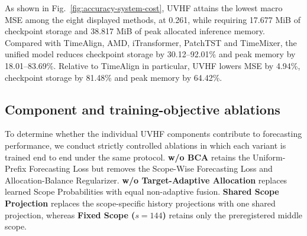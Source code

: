 \documentclass[final,3p,times]{elsarticle}
\begin{document}
As shown in Fig.~\ref{fig:accuracy-system-cost}, UVHF attains the lowest macro MSE among the eight displayed methods, at 0.261, while requiring 17.677 MiB of checkpoint storage and 38.817 MiB of peak allocated inference memory. Compared with TimeAlign, AMD, iTransformer, PatchTST and TimeMixer, the unified model reduces checkpoint storage by 30.12--92.01\% and peak memory by 18.01--83.69\%. Relative to TimeAlign in particular, UVHF lowers MSE by 4.94\%, checkpoint storage by 81.48\% and peak memory by 64.42\%.

\subsection{Component and training-objective ablations}
\label{sec:ablation}


To determine whether the individual UVHF components contribute to forecasting performance, we conduct strictly controlled ablations in which each variant is trained end to end under the same protocol. \textbf{w/o BCA} retains the Uniform-Prefix Forecasting Loss but removes the Scope-Wise Forecasting Loss and Allocation-Balance Regularizer. \textbf{w/o Target-Adaptive Allocation} replaces learned Scope Probabilities with equal non-adaptive fusion. \textbf{Shared Scope Projection} replaces the scope-specific history projections with one shared projection, whereas \textbf{Fixed Scope ($s=144$)} retains only the preregistered middle scope.
\end{document}
